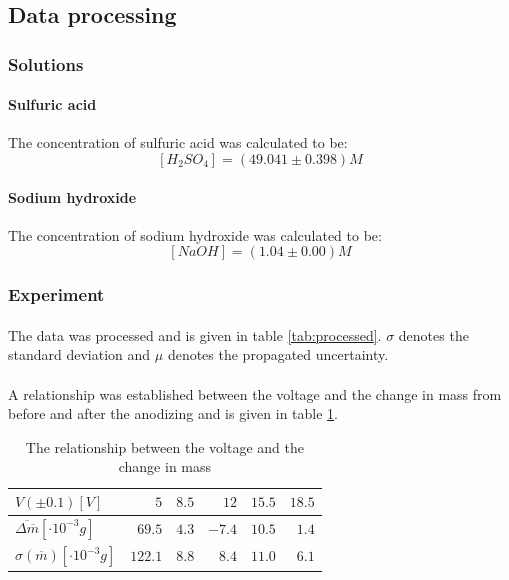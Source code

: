\documentclass[a4paper]{article}
\begin{document}
\subsection{Data processing}

\subsubsection{Solutions}

\paragraph{Sulfuric acid}
The concentration of sulfuric acid was calculated to be:
$$\left[ H_2SO_4 \right] = (49.041 \pm 0.398) \si{M} $$

\paragraph{Sodium hydroxide}
The concentration of sodium hydroxide was calculated to be:
$$\left[ NaOH \right] = (1.04 \pm 0.00) \si{M}$$

\subsubsection{Experiment}

\paragraph*{}
The data was processed and is given in table \ref{tab:processed}. $\sigma$
denotes the standard deviation and $\mu$ denotes the propagated uncertainty.

\paragraph*{}
A relationship was established between the voltage and the change in mass from
before and after the anodizing and is given in table \ref{tab:processed-delta}.

\begin{table}
  \centering
  \begin{tabular}{ l || r | r | r | r | r }
    $V (\pm 0.1) [\si{V}]$ & $5$ & $8.5$ & $12$ & $15.5$ & $18.5$ \\ \hline
    $\overline{\Delta \overline{m}} [\cdot 10^{-3} g]$ & $69.5$ & $4.3$ & $-7.4$ &
    $10.5$ & $1.4$ \\
    $\sigma (\overline{m}) [\cdot 10^{-3} g]$ & $122.1$ & $8.8$ & $8.4$ & $11.0$ &
    $6.1$ \\
  \end{tabular}
  \caption{The relationship between the voltage and the change in mass}
  \label{tab:processed-delta}
\end{table}
\end{document}
